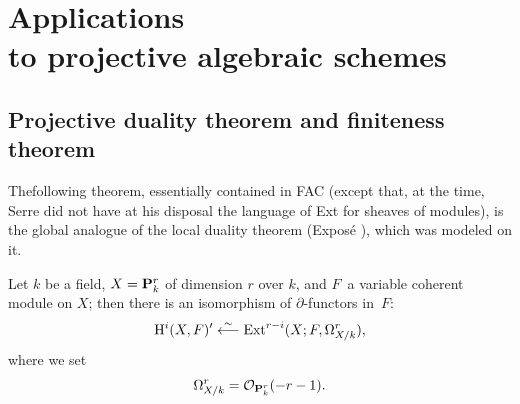 \chapter[Applications to projective algebraic schemes]
{Applications\\ to projective algebraic schemes} \label{XII}

\renewcommand{\theequation}{\arabic{equation}}

\section[Projective duality theorem and finiteness theorem]
{Projective duality theorem and finiteness theorem\protect\sfootnotemark}\label{XII.1}

The\pageoriginale following theorem, essentially contained in FAC (except that, at the time, Serre did not have at his disposal the language of Ext for sheaves of modules), is the global analogue of the local duality theorem (Expos\'e ), which was modeled on it.

\begin{theoreme} \label{XII.1.1}
Let $k$ be a field, $X=\mathbf P_k^r$  of dimension $r$ over $k$, and $F$~a variable coherent module on $X$; then there is an isomorphism of $\partial$-functors in~$F$:
\steco
\begin{equation} \label{eq:XII.1} {}\mathrm H^i(X, F)' \overset{\sim}{\longleftarrow} \operatorname{Ext}^{r-i}(X;F, \Omega_{X/k}^r),
\end{equation}
where we set
\steco
\begin{equation} \label{eq:XII.2} {}\Omega_{X/k}^r= \mathcal O_{\mathbf P_k^r}(-r-1).
\end{equation}
\end{theoreme}

